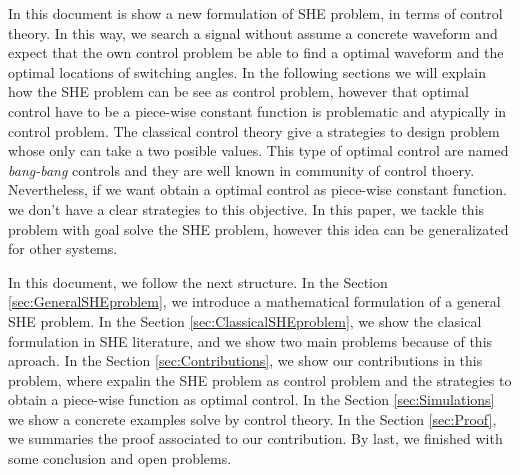 In this document is show a new formulation of SHE problem, in terms of control theory. 
%
In this way, we search a signal without assume a concrete waveform and expect that the own control problem be able to find a optimal waveform and the optimal locations of switching angles. 
%
In the following sections we will explain how the SHE problem can be see as control problem, however that optimal control have to be a piece-wise constant function is problematic and atypically  in control problem. 
%
The classical control theory give a strategies to design problem whose only can take a two posible values.
%
This type of optimal control are named \emph{bang-bang} controls and they are well known in community of control thoery. 
%
Nevertheless, if we want obtain a optimal control as piece-wise constant function. we don't have a clear strategies to this objective. 
%
In this paper, we tackle this problem with goal solve the SHE problem, however this idea can be generalizated for other systems. 


In this document, we follow the next structure. In the Section \ref{sec:GeneralSHEproblem}, we introduce a mathematical formulation of a general SHE problem. 
%
In the Section \ref{sec:ClassicalSHEproblem}, we show the clasical formulation in SHE literature, and we show two main problems because of this aproach. 
%
In the Section \ref{sec:Contributions}, we show our contributions in this problem, where expalin the SHE problem as control problem and the strategies to obtain a piece-wise function as optimal control. 
%
In the Section \ref{sec:Simulations} we show a concrete examples solve by control theory. 
%
In the Section \ref{sec:Proof}, we summaries the proof associated to our contribution. 
%
By last, we finished with some conclusion and open problems. 